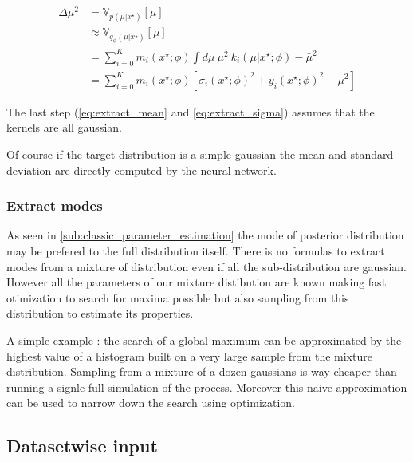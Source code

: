 \begin{align}
    \Delta\mu^2 & = \mathbb V_{p(\mu | x^\star)}[\mu] \\
    & \approx \mathbb V_{q_\phi(\mu | x^\star)}[\mu] \\
    & = \sum_{i=0}^K m_i(x^\star ; \phi) \int d\mu ~ \mu^2 ~ k_i(\mu | x^\star ; \phi) - \bar \mu^2 \\
    \label{eq:extract_sigma} & = \sum_{i=0}^K m_i(x^\star ; \phi) \left [ \sigma_i(x^\star ; \phi)^2 + y_i(x^\star ; \phi)^2 - \bar \mu^2 \right ]
\end{align}

The last step (\autoref{eq:extract_mean} and \autoref{eq:extract_sigma}) assumes that the kernels are all gaussian.

Of course if the target distribution is a simple gaussian the mean and standard deviation are directly computed by the neural network.

\subsubsection{Extract modes} %
\label{ssub:extract_modes}

As seen in \autoref{sub:classic_parameter_estimation} the mode of posterior distribution may be prefered to the full distribution itself.
There is no formulas to extract modes from a mixture of distribution even if all the sub-distribution are gaussian.
However all the parameters of our mixture distibution are known making fast otimization to search for maxima possible but also sampling from this distribution to estimate its properties.

A simple example : the search of a global maximum can be approximated by the highest value of a histogram built on a very large sample from the mixture distribution.
Sampling from a mixture of a dozen gaussians is way cheaper than running a signle full simulation of the process.
Moreover this naive approximation can be used to narrow down the search using optimization.








\subsection{Datasetwise input} %
\label{sub:datasetwise_input}


